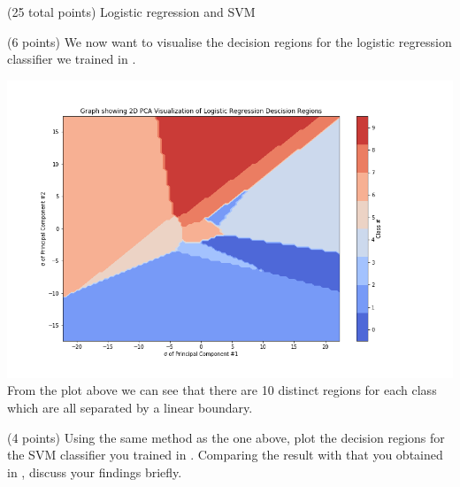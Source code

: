 \documentclass[12pt]{article}
\begin{document}
\begin{question}{(25 total points) Logistic regression and SVM}
\begin{subquestion}
\begin{answerbox}{30em}
      \end{answerbox}
  


   \end{subquestion}
   \begin{subquestion}{(6 points)
       We now want to visualise the decision regions for the logistic
       regression classifier we trained in .
     } \label{Q2.3}


   

      \begin{answerbox}{35em}
         \includegraphics[width = 1.0\textwidth]{q2_3.png}
         From the plot above we can see that there are 10 distinct regions for each class which are all separated by a linear boundary.
      \end{answerbox}
  


   \end{subquestion}
   \begin{subquestion}{(4 points)
       Using the same method as the one above, plot the decision regions for
       the SVM classifier you trained in .
       Comparing the result with that you obtained in , discuss your
       findings briefly.
     } \label{Q2.4}
   


\end{subquestion}
\end{question}
\end{document}
